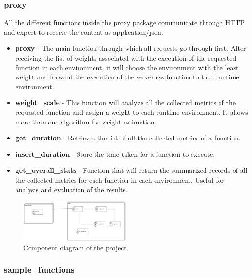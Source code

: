 \documentclass[conference]{IEEEtran}
\begin{document}
\subsubsection*{proxy}


All the different functions inside the proxy package communicate through HTTP and
expect to receive the content as application/json.

\begin{itemize}
    \item \textbf{proxy} - The main function through which all requests go through
        first. After receiving the list of weights associated with the execution of
        the requested function in each environment, it will choose the environment
        with the least weight and forward the execution of the serverless function
        to that runtime environment.
    \item \textbf{weight\_scale} - This function will analyze all the collected 
        metrics of the requested function and assign a weight to each runtime environment. It allows more than one algorithm for weight estimation.
    \item \textbf{get\_duration} - Retrieves the list of all the collected
        metrics of a function.
    \item \textbf{insert\_duration} - Store the time taken for a function to
        execute.
    \item \textbf{get\_overall\_stats} - Function that will return the summarized
        records of all the collected metrics for each function in each environment. Useful for analysis and evaluation of the results.
\end{itemize}

\begin{figure}[ht]
  \begin{center}
    \includegraphics[width=0.5\textwidth]{diss-component-diagram}
    \caption{Component diagram of the project}
    \label{fig:component_diagram}
  \end{center}
\end{figure}

\subsubsection*{sample\_functions} \label{overview:sample_functions}
\end{document}
